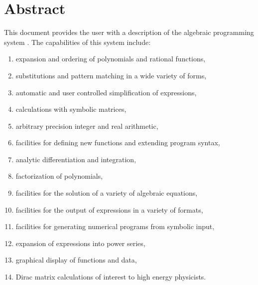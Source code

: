 \chapter*{Abstract}

\ifdefined\HCode\else
{}
\fi

This document provides the user with a description of the algebraic
programming system {\REDUCE}.  The capabilities of this system include:
\begin{enumerate}
\item expansion and ordering of polynomials and rational functions,
\item substitutions and pattern matching in a wide variety of forms,
\item automatic and user controlled simplification of expressions,
\item calculations with symbolic matrices,
\item arbitrary precision integer and real arithmetic,
\item facilities for defining new functions and extending program syntax,
\item analytic differentiation and integration,
\item factorization of polynomials,
\item facilities for the solution of a variety of algebraic equations,
\item facilities for the output of expressions in a variety of formats,
\item facilities for generating numerical programs from symbolic input,
\item expansion of expressions into power series,
\item graphical display of functions and data,
\item Dirac matrix calculations of interest to high energy physicists.
\end{enumerate}
